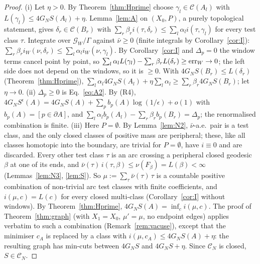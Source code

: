 \documentclass[aps,prd,onecolumn,superscriptaddress,nofootinbib,amsmath,amssymb,11pt]{revtex4-2}
\theoremstyle{definition}
\newcommand{\Cut}{\mathcal{C}}
\newcommand{\CN}{\mathcal{C}_N}
\newcommand{\eps}{\epsilon}
\newcommand{\G}{\mathcal{G}}
\begin{document}
\begin{proof}
(i) Let $\eta>0$. By Theorem~\ref{thm:Hprime} choose $\gamma_l\in\Cut(A_l)$ with $L(\gamma_l)\le4G_NS(A_l)+\eta$. Lemma~\ref{lem:A}
on $(X_0,P)$, a purely topological statement, gives $\delta_r\in\Cut(B_r)$ with
$\sum_r\beta_ri(\tau,\delta_r)\le\sum_l\alpha_li(\tau,\gamma_l)$ for every test class $\tau$. Integrate over $\G_W/\Gamma$ against
$\bar\nu\ge0$ (finite integrals by Corollary~\ref{cor:I}): $\sum_r\beta_ri_W(\nu,\delta_r)\le\sum_l\alpha_li_W(\nu,\gamma_l)$. By
Corollary~\ref{cor:I} and $\Delta_p=0$ the window terms cancel point by point, so
$\sum_l\alpha_lL(\gamma_l)-\sum_r\beta_rL(\delta_r)\ge{\rm err}_W\to0$; the left side does not depend on the windows, so it is $\ge0$.
With $4G_NS(B_r)\le L(\delta_r)$ (Theorem~\ref{thm:Hprime}),
$\sum_l\alpha_l4G_NS(A_l)+\eta\sum_l\alpha_l\ge\sum_r\beta_r4G_NS(B_r)$; let $\eta\to0$.
(ii) $\Delta_p\ge0$ is Eq.~\eqref{eq:A2}. By (R4), $4G_NS^\eps(A)=4G_NS(A)+\sum_pb_p(A)\log(1/\eps)+o(1)$ with $b_p(A)=[p\in\partial A]$,
and $\sum_l\alpha_lb_p(A_l)-\sum_r\beta_rb_p(B_r)=\Delta_p$; the renormalised combination is finite.
(iii) Here $P=\emptyset$. By Lemma~\ref{lem:N2}, $\bar\nu$-a.e.\ pair is a test class, and the only closed classes of positive mass are
peripheral; these, like all classes homotopic into the boundary, are trivial for $P=\emptyset$, have $i\equiv0$ and are discarded. Every other test class $\tau$ is an arc crossing a peripheral
closed geodesic $\beta$ at one of its ends, and $\bar\nu(\tau)\,i(\tau,\beta)\le\nu(F_\beta)=L(\beta)<\infty$ (Lemmas~\ref{lem:N3},
\ref{lem:S}). So $\mu:=\sum_\tau\bar\nu(\tau)\,\tau$ is a countable positive combination of non-trivial arc test classes with finite
coefficients, and $i(\mu,c)=L(c)$ for every closed multi-class (Corollary~\ref{cor:I} without windows). By
Theorem~\ref{thm:Hprime}, $4G_NS(A)=\inf_ci(\mu,c)$. The proof of Theorem~\ref{thm:graph} (with $X_1=X_0$, $\mu'=\mu$, no endpoint
edges) applies verbatim to such a combination (Remark~\ref{rem:vacuse}), except that the minimiser $c_A$ is replaced by a class with
$i(\mu,c_A)\le4G_NS(A)+\eta$: the resulting graph has min-cuts between $4G_NS$ and $4G_NS+\eta$. Since $\CN$ is closed,
$S\in\CN$.
\end{proof}
\end{document}
